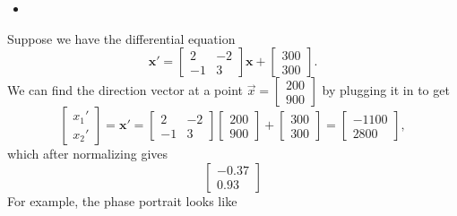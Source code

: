 \begin{itemize}
\begin{itemize}
              \item
          \end{itemize}
          \begin{example}
              Suppose we have the differential equation
              \begin{equation}
                  \bm{x}'= \begin{bmatrix}
                      2 & -2 \\ -1&3
                  \end{bmatrix}\bm{x} + \begin{bmatrix}
                      300 \\ 300
                  \end{bmatrix}.
              \end{equation}
              We can find the direction vector at a point $\vec{x}=\begin{bmatrix}
                      200 \\ 900
                  \end{bmatrix}$ by plugging it in to get
              \begin{equation}
                  \begin{bmatrix}
                      x_1' \\ x_2'
                  \end{bmatrix} = \bm{x}' = \begin{bmatrix}
                      2 & - 2 \\ -1 & 3
                  \end{bmatrix}\begin{bmatrix}
                      200 \\ 900
                  \end{bmatrix} + \begin{bmatrix}
                      300 \\ 300
                  \end{bmatrix} = \begin{bmatrix}
                      -1100 \\ 2800
                  \end{bmatrix},
              \end{equation}
              which after normalizing gives
              \begin{equation}
                  \begin{bmatrix}
                      -0.37 \\ 0.93
                  \end{bmatrix}
              \end{equation}
              For example, the phase portrait looks like
              \begin{center}
                  \def\length{sqrt((2*x-2*y+300)^2+(-1*x+3*y+300)^2)}


\end{center}
\end{example}
\end{itemize}
